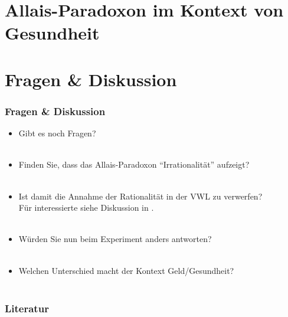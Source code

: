 \documentclass{beamer}
\begin{document}
\section{Allais-Paradoxon im Kontext von Gesundheit}

\section{Fragen \& Diskussion}

\begin{frame}
  \frametitle{Fragen \& Diskussion}
  \begin{itemize}
  \item<1> Gibt es noch Fragen?\\~\\
  \item<2-> Finden Sie, dass das Allais-Paradoxon "`Irrationalit\"at"' aufzeigt?\\~\\
  \item<2-> Ist damit die Annahme der Rationalit\"at in der VWL zu verwerfen?\\
    F\"ur interessierte siehe Diskussion in \textcite[Kapitel 12]{gintis2009bounds}.\\~\\
  \item<2-> W\"urden Sie nun beim Experiment anders antworten?\\~\\
  \item<2-> Welchen Unterschied macht der Kontext Geld/Gesundheit?\\~\\
    
  \end{itemize}
\end{frame}


\begin{frame}[allowframebreaks]
  \frametitle{Literatur}
  \nocite{barbera2004handbook}
  \nocite{gintis2009bounds}
  \nocite{rieck2012spieltheorie}
  \nocite{osborne2004introduction}
  \printbibliography
\end{frame}
\end{document}

